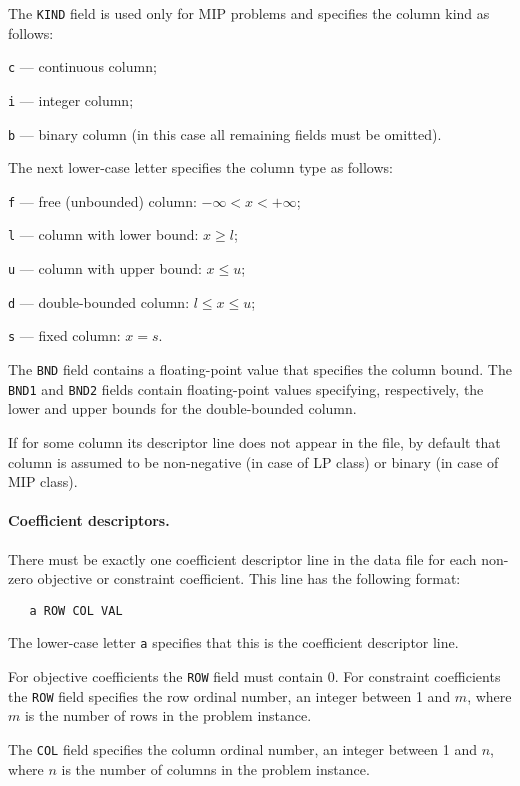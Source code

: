The \verb|KIND| field is used only for MIP problems and specifies the
column kind as follows:

\verb|c| --- continuous column;

\verb|i| --- integer column;

\verb|b| --- binary column (in this case all remaining fields must be
omitted).

The next lower-case letter specifies the column type as follows:

\verb|f| --- free (unbounded) column: $-\infty<x<+\infty$;

\verb|l| --- column with lower bound: $x\geq l$;

\verb|u| --- column with upper bound: $x\leq u$;

\verb|d| --- double-bounded column: $l\leq x\leq u$;

\verb|s| --- fixed column: $x=s$.

The \verb|BND| field contains a floating-point value that specifies the
column bound. The \verb|BND1| and \verb|BND2| fields contain
floating-point values specifying, respectively, the lower and upper
bounds for the double-bounded column.

If for some column its descriptor line does not appear in the file, by
default that column is assumed to be non-negative (in case of LP class)
or binary (in case of MIP class).

\paragraph{Coefficient descriptors.} There must be exactly one
coefficient descriptor line in the data file for each non-zero
objective or constraint coefficient. This line has the following format:

\begin{verbatim}
   a ROW COL VAL
\end{verbatim}

The lower-case letter \verb|a| specifies that this is the coefficient
descriptor line.

For objective coefficients the \verb|ROW| field must contain 0. For
constraint coefficients the \verb|ROW| field specifies the row ordinal
number, an integer between 1 and $m$, where $m$ is the number of rows
in the problem instance.

The \verb|COL| field specifies the column ordinal number, an integer
between 1 and $n$, where $n$ is the number of columns in the problem
instance.

